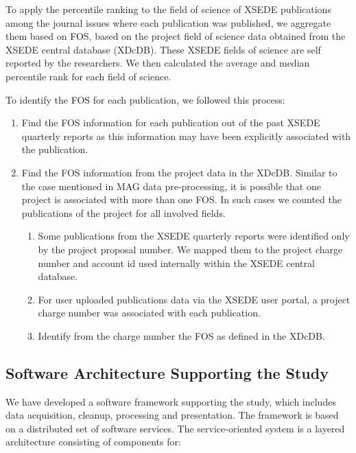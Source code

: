 \documentclass{sig-alternate}
\begin{document}
To apply the percentile ranking to the field of science of XSEDE publications
among the journal issues where each publication was published, we aggregate
them based on FOS, based on the project field of science data obtained from the XSEDE central
database (XDcDB). These XSEDE fields of science are self reported by the researchers. We then calculated the average and median percentile rank for each field
of science.

To identify the FOS for each publication, we followed this process:

\begin{enumerate}

\item Find the FOS information for each publication out of the past XSEDE quarterly reports as this
information may have been explicitly associated with the publication.

\item Find the FOS information from the project data in the XDcDB. Similar to the case mentioned
in MAG data pre-processing, it is possible that one project is associated with more
than one FOS. In such cases we counted the publications of the project for all involved fields.

\begin{enumerate}

\item Some publications from the XSEDE quarterly reports were identified only by
the project proposal number. We mapped them to the project charge number
and account id used internally within the XSEDE central database.

\item For user uploaded publications data via the XSEDE user portal, a project
charge number was associated with each publication.

\item Identify from the charge number the FOS as defined in the XDcDB.

\end{enumerate}

\end{enumerate}

\subsection{Software Architecture Supporting the Study}

We have developed a software framework supporting the study, which includes data acquisition,
cleanup, processing and presentation. The framework is based on a distributed set of software
services. The service-oriented system is a layered architecture consisting of components for:
\end{document}
